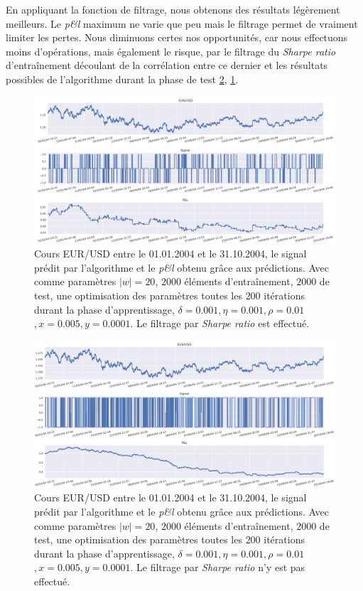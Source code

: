 \documentclass[a4paper, 11pt]{article}
\begin{document}
En appliquant la fonction de filtrage, nous obtenons des résultats légèrement meilleurs. Le \textit{p\&l} maximum ne varie que peu mais le filtrage permet de vraiment limiter les pertes. Nous diminuons certes nos opportunités, car nous effectuons moins d'opérations, mais également le risque, par le filtrage du \textit{Sharpe ratio} d'entraînement découlant de la corrélation entre ce dernier et les résultats possibles de l'algorithme durant la phase de test \ref{exemple sans filtrage}, \ref{exemple avec filtrage}. 

\begin{figure}
	\centering
	\includegraphics[scale=0.5]{res/exemple_avec_filtrage}
	\caption[Blup]{Cours EUR/USD entre le 01.01.2004 et le 31.10.2004, le signal prédit par l'algorithme et le \textit{p\&l} obtenu grâce aux prédictions. Avec comme paramètres $|w| = 20$, $2000$ éléments d'entraînement, $2000$ de test, une optimisation des
		paramètres toutes les $200$ itérations durant la phase d'apprentissage, $\delta = 0.001, \eta=0.001,\rho=0.01$
		\footnotemark$, x = 0.005, y=0.0001$. Le filtrage par \textit{Sharpe ratio} est effectué.}
	\label{exemple avec filtrage}
\end{figure}

\begin{figure}
	\centering
	\includegraphics[scale=0.5]{res/exemple_sans_filtrage}
	\caption[Blup]{Cours EUR/USD entre le 01.01.2004 et le 31.10.2004, le signal prédit par l'algorithme et le \textit{p\&l} obtenu grâce aux prédictions. Avec comme paramètres $|w| = 20$, $2000$ éléments d'entraînement, $2000$ de test, une optimisation des
		paramètres toutes les $200$ itérations durant la phase d'apprentissage, $\delta = 0.001, \eta=0.001,\rho=0.01$
		\footnotemark$, x = 0.005, y=0.0001$. Le filtrage par \textit{Sharpe ratio} n'y est pas effectué.}
	\label{exemple sans filtrage}
\end{figure}
\clearpage
\end{document}
